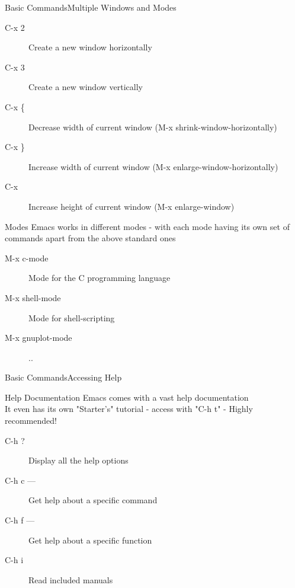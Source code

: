\documentclass{beamer}
\begin{document}
\begin{frame}{Basic Commands}{Multiple Windows and Modes}
\begin{description}
\item[C-x 2] Create a new window horizontally
\item[C-x 3] Create a new window vertically
\item[C-x \{] Decrease width of current window (M-x shrink-window-horizontally)
\item[C-x \}] Increase width of current window (M-x enlarge-window-horizontally)
\item[C-x ] Increase height of current window (M-x enlarge-window)
\end{description}
\begin{block}{Modes}
Emacs works in different modes - with each mode having its own set of commands apart from the above standard ones
\end{block}
\begin{description}
\item[M-x c-mode] Mode for the C programming language
\item[M-x shell-mode] Mode for shell-scripting
\item[M-x gnuplot-mode] 
..
\end{description}
\end{frame}

\begin{frame}{Basic Commands}{Accessing Help}
\begin{block}{Help Documentation}
Emacs comes with a vast help documentation\\
It even has its own "Starter's" tutorial - access with "C-h t" - Highly recommended!
\end{block}
\begin{description}
\item[C-h ?] Display all the help options
\item[C-h c ---] Get help about a specific command
\item[C-h f ---] Get help about a specific function
\item[C-h i] Read included manuals
\end{description}

\end{frame}
\end{document}
